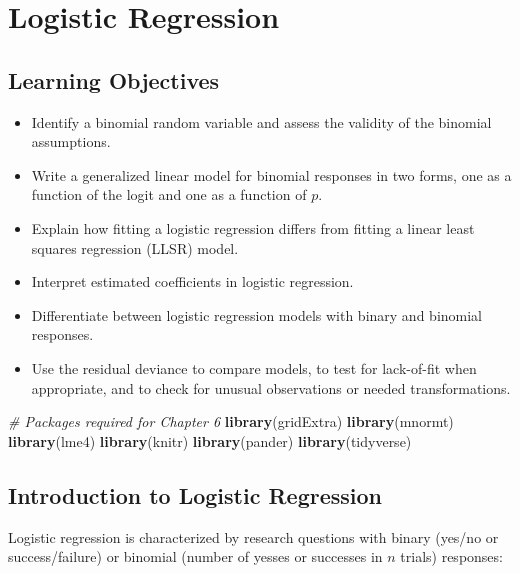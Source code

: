 \documentclass[
]{krantz}
\newenvironment{Shaded}{\begin{snugshade}}{\end{snugshade}}
\newcommand{\CommentTok}[1]{\textcolor[rgb]{0.37,0.37,0.37}{\textit{#1}}}
\newcommand{\FunctionTok}[1]{\textcolor[rgb]{0.27,0.27,0.27}{\textbf{#1}}}
\newcommand{\NormalTok}[1]{#1}
\providecommand{\tightlist}{%
  \setlength{\itemsep}{0pt}\setlength{\parskip}{0pt}}
\begin{document}
\chapter{Logistic Regression}\label{ch-logreg}

\section{Learning Objectives}\label{learning-objectives-5}

\begin{itemize}
\tightlist
\item
  Identify a binomial random variable and assess the validity of the binomial assumptions.
\item
  Write a generalized linear model for binomial responses in two forms, one as a function of the logit and one as a function of \(p\).
\item
  Explain how fitting a logistic regression differs from fitting a linear least squares regression (LLSR) model.
\item
  Interpret estimated coefficients in logistic regression.
\item
  Differentiate between logistic regression models with binary and binomial responses.
\item
  Use the residual deviance to compare models, to test for lack-of-fit when appropriate, and to check for unusual observations or needed transformations.
\end{itemize}

\begin{Shaded}
\begin{Highlighting}[]
\CommentTok{\# Packages required for Chapter 6}
\FunctionTok{library}\NormalTok{(gridExtra)  }
\FunctionTok{library}\NormalTok{(mnormt) }
\FunctionTok{library}\NormalTok{(lme4) }
\FunctionTok{library}\NormalTok{(knitr) }
\FunctionTok{library}\NormalTok{(pander)}
\FunctionTok{library}\NormalTok{(tidyverse)}
\end{Highlighting}
\end{Shaded}

\section{Introduction to Logistic Regression}\label{introduction-to-logistic-regression}

Logistic regression is characterized by research questions with binary (yes/no or success/failure) or binomial (number of yesses or successes in \(n\) trials) responses:
\end{document}

